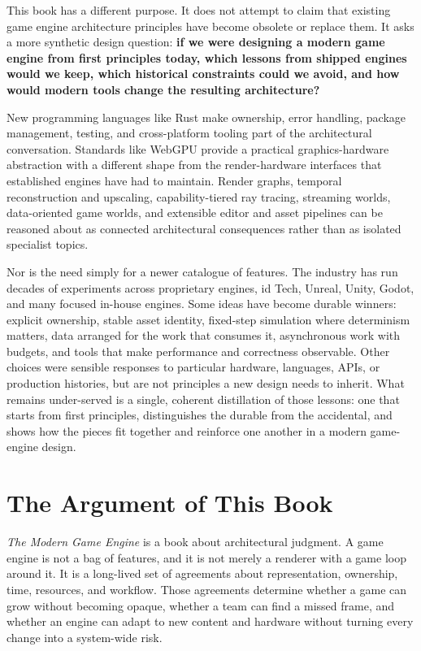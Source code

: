\documentclass[
  11pt,
  letterpaper,
  DIV=11,
  numbers=noendperiod,
  twoside,
  open=right]{scrreprt}
\begin{document}
This book has a different purpose. It does not attempt to claim that
existing game engine architecture principles have become obsolete or
replace them. It asks a more synthetic design question: \textbf{if we
were designing a modern game engine from first principles today, which
lessons from shipped engines would we keep, which historical constraints
could we avoid, and how would modern tools change the resulting
architecture?}

New programming languages like Rust make ownership, error handling,
package management, testing, and cross-platform tooling part of the
architectural conversation. Standards like WebGPU provide a practical
graphics-hardware abstraction with a different shape from the
render-hardware interfaces that established engines have had to
maintain. Render graphs, temporal reconstruction and upscaling,
capability-tiered ray tracing, streaming worlds, data-oriented game
worlds, and extensible editor and asset pipelines can be reasoned about
as connected architectural consequences rather than as isolated
specialist topics.

Nor is the need simply for a newer catalogue of features. The industry
has run decades of experiments across proprietary engines, id Tech,
Unreal, Unity, Godot, and many focused in-house engines. Some ideas have
become durable winners: explicit ownership, stable asset identity,
fixed-step simulation where determinism matters, data arranged for the
work that consumes it, asynchronous work with budgets, and tools that
make performance and correctness observable. Other choices were sensible
responses to particular hardware, languages, APIs, or production
histories, but are not principles a new design needs to inherit. What
remains under-served is a single, coherent distillation of those
lessons: one that starts from first principles, distinguishes the
durable from the accidental, and shows how the pieces fit together and
reinforce one another in a modern game-engine design.

\section*{The Argument of This Book}\label{the-argument-of-this-book}


\emph{The Modern Game Engine} is a book about architectural judgment. A
game engine is not a bag of features, and it is not merely a renderer
with a game loop around it. It is a long-lived set of agreements about
representation, ownership, time, resources, and workflow. Those
agreements determine whether a game can grow without becoming opaque,
whether a team can find a missed frame, and whether an engine can adapt
to new content and hardware without turning every change into a
system-wide risk.
\end{document}
